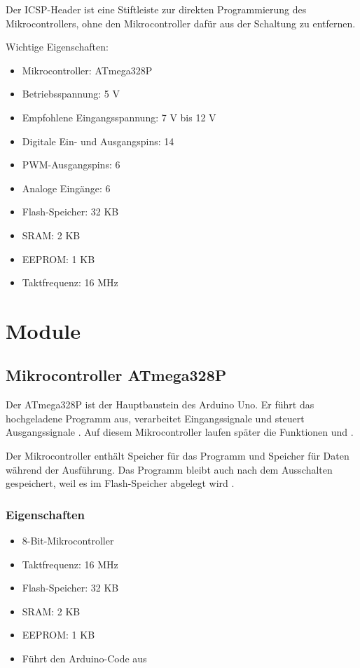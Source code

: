Der ICSP-Header ist eine Stiftleiste zur direkten Programmierung des Mikrocontrollers, ohne den Mikrocontroller dafür aus der Schaltung zu entfernen.


Wichtige Eigenschaften:
\begin{itemize}
	\item Mikrocontroller: ATmega328P 
	\item Betriebsspannung: 5 V 
	\item Empfohlene Eingangsspannung: 7 V bis 12 V 
	\item Digitale Ein- und Ausgangspins: 14 
	\item PWM-Ausgangspins: 6 
	\item Analoge Eingänge: 6 
	\item Flash-Speicher: 32 KB 
	\item SRAM: 2 KB 
	\item EEPROM: 1 KB 
	\item Taktfrequenz: 16 MHz \cite{arduino:uno-datasheet}
\end{itemize}



\section{Module}

\subsection{Mikrocontroller ATmega328P}



Der ATmega328P ist der Hauptbaustein des Arduino Uno. Er führt das hochgeladene Programm aus, verarbeitet Eingangssignale und steuert Ausgangssignale \cite{arduino:uno-datasheet}. Auf diesem Mikrocontroller laufen später die Funktionen  und  \cite{arduino:language-reference}.

Der Mikrocontroller enthält Speicher für das Programm und Speicher für Daten während der Ausführung. Das Programm bleibt auch nach dem Ausschalten gespeichert, weil es im Flash-Speicher abgelegt wird \cite{arduino:uno-datasheet}.


\subsubsection{Eigenschaften}

\begin{itemize}
	\item 8-Bit-Mikrocontroller 
	\item Taktfrequenz: 16 MHz 
	\item Flash-Speicher: 32 KB 
	\item SRAM: 2 KB 
	\item EEPROM: 1 KB \cite{arduino:uno-datasheet}
	\item Führt den Arduino-Code aus \cite{arduino:language-reference}
\end{itemize}


